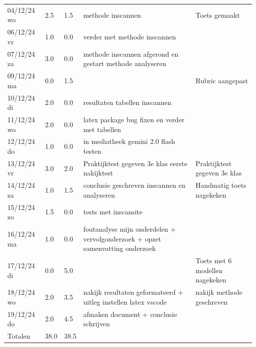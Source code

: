 \documentclass[12pt]{article}
\begin{document}
\begin{longtable}{@{}p{2.5cm} p{1cm} p{1.5cm} p{5cm} p{5cm}}
04/12/24 wo & 2.5 & 1.5 & methode inscannen & Toets gemaakt \\
06/12/24 vr & 1.0 & 0.0 & verder met methode inscannen &  \\
07/12/24 za & 3.0 & 0.0 & methode inscannen afgerond en gestart methode analyseren &  \\
09/12/24 ma & 0.0 & 1.5 &  & Rubric aangepast \\
10/12/24 di & 2.0 & 0.0 & resultaten tabellen inscannen &  \\
11/12/24 wo & 2.0 & 0.0 & latex package bug fixen en verder met tabellen &  \\
12/12/24 do & 1.0 & 0.0 & in mediatheek gemini 2.0 flash testen &  \\
13/12/24 vr & 3.0 & 2.0 & Praktijktest gegeven 3e klas eerste nakijktest & Praktijktest gegeven 3e klas \\
14/12/24 za & 1.0 & 1.5 & conclusie geschreven inscannen en analyseren & Handmatig toets nagekeken \\
15/12/24 zo & 1.5 & 0.0 & tests met inscansite &  \\
16/12/24 ma & 1.0 & 0.0 & foutanalyse mijn onderdelen + vervolgonderzoek + opzet samenvatting onderzoek &  \\
17/12/24 di & 0.0 & 5.0 &  & Toets met 6 modellen nagekeken \\
18/12/24 wo & 2.0 & 3.5 & nakijk resultaten geformateerd + uitleg instellen latex vscode & nakijk methode geschreven \\
19/12/24 do & 2.0 & 4.5 & afmaken document + conclusie schrijven &  \\
\midrule 
Totalen & 38.0 & 38.5 & & \\
\bottomrule
\end{longtable}
\normalsize
\end{document}

